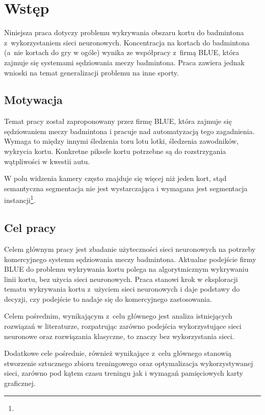 \chapter{Wstęp}

Niniejsza praca dotyczy problemu wykrywania obszaru kortu do badmintona z~wykorzystaniem sieci neuronowych.
Koncentracja na kortach do badmintona (a~nie kortach do gry w ogóle) wynika ze współpracy z~firmą BLUE, która zajmuje się systemami sędziowania meczy badmintona.
Praca zawiera jednak wnioski na temat generalizacji problemu na inne sporty.

\section{Motywacja}

Temat pracy został zaproponowany przez firmę BLUE, która zajmuje się sędziowaniem meczy badmintona i pracuje nad automatyzacją tego zagadnienia.
Wymaga to między innymi śledzenia toru lotu lotki, śledzenia zawodników, wykrycia kortu.
Konkretne piksele kortu potrzebne są do rozstrzygania wątpliwości w kwestii autu.

W polu widzenia kamery często znajduje się więcej niż jeden kort, stąd semantyczna segmentacja nie jest wystarczająca i wymagana jest segmentacja instancji\footnote{}.

\section{Cel pracy}

Celem głównym pracy jest zbadanie użyteczności sieci neuronowych na potrzeby komercyjnego systemu sędziowania meczy badmintona.
Aktualne podejście firmy BLUE do problemu wykrywania kortu polega na algorytmicznym wykrywaniu linii kortu, bez użycia sieci neuronowych.
Praca stanowi krok w eksploracji tematu wykrywania kortu z~użyciem sieci neuronowych i daje podstawy do decyzji, czy podejście to nadaje się do komercyjnego zastosowania.

Celem pośrednim, wynikającym z~celu głównego jest analiza istniejących rozwiązań w literaturze, rozpatrując zarówno podejścia wykorzystujące sieci neuronowe oraz rozwiązania klasyczne, to znaczy bez wykorzystania sieci.

Dodatkowe cele pośrednie, również wynikające z~celu głównego stanowią stworzenie sztucznego zbioru treningowego oraz optymalizacja wykorzystywanej sieci, zarówno pod kątem czasu treningu jak i wymagań pamięciowych karty graficznej.

